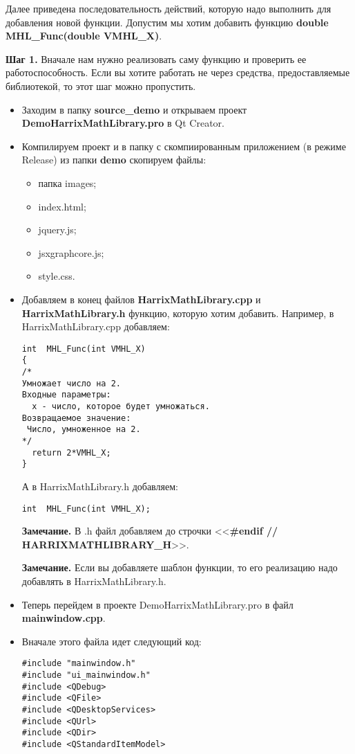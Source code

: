Далее приведена последовательность действий, которую надо выполнить для добавления новой функции. Допустим мы хотим добавить функцию  \textbf{double MHL\_Func(double VMHL\_X)}.

\textbf{Шаг 1.}\label{step1} Вначале нам нужно реализовать саму функцию и проверить ее работоспособность. Если вы хотите работать не через средства, предоставляемые библиотекой, то этот шаг можно пропустить.

\begin{itemize}
\item Заходим в папку \textbf{source\_demo} и открываем проект \textbf{DemoHarrixMathLibrary.pro} в Qt Creator.
\item Компилируем проект и в папку с скомпиированным приложением (в режиме Release) из папки \textbf{demo} скопируем файлы:
\begin{itemize}
\item  папка images;
\item  index.html;
\item  jquery.js;
\item  jsxgraphcore.js;
\item  style.css.
\end {itemize}
\item Добавляем в конец файлов \textbf{HarrixMathLibrary.cpp} и \textbf{HarrixMathLibrary.h} функцию, которую хотим добавить. Например, в HarrixMathLibrary.cpp добавляем:
\begin{lstlisting}[label=examplefunction01, caption=Что добавляем в HarrixMathLibrary.cpp]
int  MHL_Func(int VMHL_X)
{
/*
Умножает число на 2.
Входные параметры:
  x - число, которое будет умножаться.
Возвращаемое значение:
 Число, умноженное на 2.
*/
  return 2*VMHL_X;
}
\end{lstlisting}
А в HarrixMathLibrary.h добавляем:
\begin{lstlisting}[label=examplefunction02, caption=Что добавляем в HarrixMathLibrary.h]
int  MHL_Func(int VMHL_X);
\end{lstlisting}
\textbf{Замечание.} В .h файл добавляем до строчки <<\textbf{\#endif // HARRIXMATHLIBRARY\_H}>>.

\textbf{Замечание.} Если вы добавляете шаблон функции, то его реализацию надо добавлять в HarrixMathLibrary.h.
\item Теперь перейдем в проекте DemoHarrixMathLibrary.pro в файл \textbf{mainwindow.cpp}.
\item Вначале этого файла идет следующий код:
\begin{lstlisting}[label=examplefunction03, caption=mainwindow.cpp]
#include "mainwindow.h"
#include "ui_mainwindow.h"
#include <QDebug>
#include <QFile>
#include <QDesktopServices>
#include <QUrl>
#include <QDir>
#include <QStandardItemModel>


\end{lstlisting}
\end{itemize}
